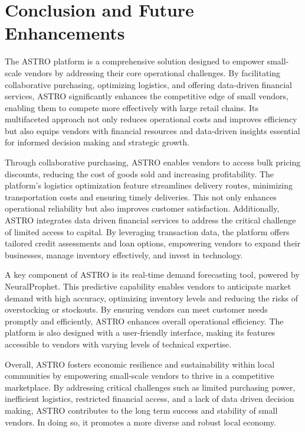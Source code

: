 \chapter{Conclusion and Future Enhancements}
The ASTRO platform is a comprehensive solution designed to empower small-scale vendors by addressing their core operational challenges. By facilitating collaborative purchasing, optimizing logistics, and offering data-driven financial services, ASTRO significantly enhances the competitive edge of small vendors, enabling them to compete more effectively with large retail chains. Its multifaceted approach not only reduces operational costs and improves efficiency but also equips vendors with financial resources and data-driven insights essential for informed decision making and strategic growth.

Through collaborative purchasing, ASTRO enables vendors to access bulk pricing discounts, reducing the cost of goods sold and increasing profitability. The platform’s logistics optimization feature streamlines delivery routes, minimizing transportation costs and ensuring timely deliveries. This not only enhances operational reliability but also improves customer satisfaction. Additionally, ASTRO integrates data driven financial services to address the critical challenge of limited access to capital. By leveraging transaction data, the platform offers tailored credit assessments and loan options, empowering vendors to expand their businesses, manage inventory effectively, and invest in technology.

A key component of ASTRO is its real-time demand forecasting tool, powered by NeuralProphet. This predictive capability enables vendors to anticipate market demand with high accuracy, optimizing inventory levels and reducing the risks of overstocking or stockouts. By ensuring vendors can meet customer needs promptly and efficiently, ASTRO enhances overall operational efficiency. The platform is also designed with a user-friendly interface, making its features accessible to vendors with varying levels of technical expertise.

Overall, ASTRO fosters economic resilience and sustainability within local communities by empowering small-scale vendors to thrive in a competitive marketplace. By addressing critical challenges such as limited purchasing power, inefficient logistics, restricted financial access, and a lack of data driven decision making, ASTRO contributes to the long term success and stability of small vendors. In doing so, it promotes a more diverse and robust local economy.

